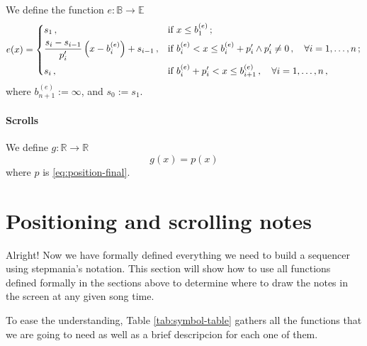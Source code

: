 \documentclass[a4paper,9pt]{article}
\begin{document}
We define the function $ e:\mathbb{B}\rightarrow \mathbb{E} $
\begin{equation}
	e(x) = \begin{dcases}
		s_1\,, & \text{if $ x\leq b_1^{(e)} $}\,;\\
		\frac{s_i-s_{i-1}}{p'_i} \left( x-b_{i}^{(e)} \right)+s_{i-1} \,, & \text{if $ b_{i}^{(e)} < x \leq b_{i}^{(e)}+p'_i \land p'_i \neq 0\,,\quad \forall i=1,\dots,n$}\,;\\
		s_i\,, &\text{if $ b_{i}^{(e)}+p'_i < x \leq b_{i+1}^{(e)}\,,\quad \forall i=1,\dots,n$}\,,\\
	\end{dcases}
	\label{eq:e}
\end{equation}
where $ b_{n+1}^{(e)} := \infty $, and $ s_0 := s_1 $.

\paragraph{Scrolls}

We define $g: \mathbb{R}\rightarrow \mathbb{R} $
\begin{equation}
	g(x) = p(x)
	\label{eq:finalGx}
\end{equation}
where $ p $ is \eqref{eq:position-final}.

\section{Positioning and scrolling notes}

Alright! Now we have formally defined everything we need to build a sequencer using stepmania's notation. This section will show how to use all functions defined formally in the sections above to determine where to draw the notes in the screen at any given song time. 

To ease the understanding, Table \ref{tab:symbol-table} gathers all the functions that we are going to need as well as a brief descripcion for each one of them.
\end{document}
